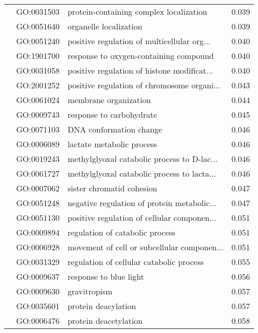 \begin{longtable}{lllr}
   & GO:0031503 &      protein-containing complex localization &         0.039 \\
   & GO:0051640 &                       organelle localization &         0.039 \\
   & GO:0051240 &  positive regulation of multicellular org... &         0.040 \\
   & GO:1901700 &       response to oxygen-containing compound &         0.040 \\
   & GO:0031058 &  positive regulation of histone modificat... &         0.040 \\
   & GO:2001252 &  positive regulation of chromosome organi... &         0.043 \\
   & GO:0061024 &                        membrane organization &         0.044 \\
   & GO:0009743 &                     response to carbohydrate &         0.045 \\
   & GO:0071103 &                      DNA conformation change &         0.046 \\
   & GO:0006089 &                    lactate metabolic process &         0.046 \\
   & GO:0019243 &  methylglyoxal catabolic process to D-lac... &         0.046 \\
   & GO:0061727 &  methylglyoxal catabolic process to lacta... &         0.046 \\
   & GO:0007062 &                    sister chromatid cohesion &         0.047 \\
   & GO:0051248 &  negative regulation of protein metabolic... &         0.047 \\
   & GO:0051130 &  positive regulation of cellular componen... &         0.051 \\
   & GO:0009894 &              regulation of catabolic process &         0.051 \\
   & GO:0006928 &  movement of cell or subcellular componen... &         0.051 \\
   & GO:0031329 &     regulation of cellular catabolic process &         0.055 \\
   & GO:0009637 &                       response to blue light &         0.056 \\
   & GO:0009630 &                                 gravitropism &         0.057 \\
   & GO:0035601 &                          protein deacylation &         0.057 \\
   & GO:0006476 &                        protein deacetylation &         0.058 \\

\end{longtable}
